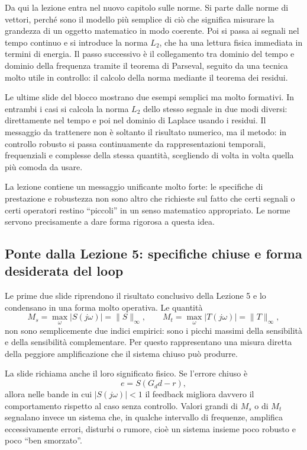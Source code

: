 \documentclass[11pt,a4paper]{article}
\begin{document}
Da qui la lezione entra nel nuovo capitolo sulle norme. Si parte dalle norme di vettori, perché sono il modello più semplice di ciò che significa misurare la grandezza di un oggetto matematico in modo coerente. Poi si passa ai segnali nel tempo continuo e si introduce la norma $L_2$, che ha una lettura fisica immediata in termini di energia. Il passo successivo è il collegamento tra dominio del tempo e dominio della frequenza tramite il teorema di Parseval, seguito da una tecnica molto utile in controllo: il calcolo della norma mediante il teorema dei residui.

Le ultime slide del blocco mostrano due esempi semplici ma molto formativi. In entrambi i casi si calcola la norma $L_2$ dello stesso segnale in due modi diversi: direttamente nel tempo e poi nel dominio di Laplace usando i residui. Il messaggio da trattenere non è soltanto il risultato numerico, ma il metodo: in controllo robusto si passa continuamente da rappresentazioni temporali, frequenziali e complesse della stessa quantità, scegliendo di volta in volta quella più comoda da usare.

\begin{keybox}
La lezione contiene un messaggio unificante molto forte: le specifiche di prestazione e robustezza non sono altro che richieste sul fatto che certi segnali o certi operatori restino ``piccoli'' in un senso matematico appropriato. Le norme servono precisamente a dare forma rigorosa a questa idea.
\end{keybox}

\subsection{Ponte dalla Lezione 5: specifiche chiuse e forma desiderata del loop}

Le prime due slide riprendono il risultato conclusivo della Lezione 5 e lo condensano in una forma molto operativa. Le quantità
$$
M_s=\max_\omega |S(j\omega)|=\|S\|_\infty,
\qquad
M_t=\max_\omega |T(j\omega)|=\|T\|_\infty,
$$
non sono semplicemente due indici empirici: sono i picchi massimi della sensibilità e della sensibilità complementare. Per questo rappresentano una misura diretta della peggiore amplificazione che il sistema chiuso può produrre.

La slide richiama anche il loro significato fisico. Se l'errore chiuso è
$$
e = S(G_d d-r),
$$
allora nelle bande in cui $|S(j\omega)|<1$ il feedback migliora davvero il comportamento rispetto al caso senza controllo. Valori grandi di $M_s$ o di $M_t$ segnalano invece un sistema che, in qualche intervallo di frequenze, amplifica eccessivamente errori, disturbi o rumore, cioè un sistema insieme poco robusto e poco ``ben smorzato''.
\end{document}
